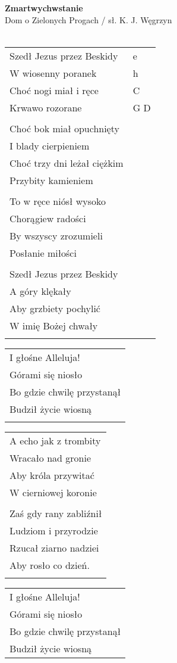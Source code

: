 \documentclass[a5paper]{article}
\begin{document}


\noindent
\fontsize{12pt}{15pt}\selectfont
\textbf{Zmartwychwstanie} \\
\fontsize{8pt}{10pt}\selectfont
Dom o Zielonych Progach / sł. K. J. Węgrzyn \\ \\
\fontsize{10pt}{12pt}\selectfont
{}
\begin{tabular}{@{}p{6.00cm}p{3cm}@{}}
\noindent
Szedł Jezus przez Beskidy & e \\
W wiosenny poranek & h \\
Choć nogi miał i ręce & C \\
Krwawo rozorane & G D \\ \\

Choć bok miał opuchnięty \\
I blady cierpieniem \\
Choć trzy dni leżał ciężkim \\
Przybity kamieniem \\ \\

To w ręce niósł wysoko \\
Chorągiew radości \\
By wszyscy zrozumieli \\ 
Posłanie miłości \\ \\

Szedł Jezus przez Beskidy \\
A góry klękały \\
Aby grzbiety pochylić \\
W imię Bożej chwały \\ \\
\end{tabular}

\noindent
\begin{tabular}{@{}p{5.00cm}@{}}
I głośne Alleluja! \\
Górami się niosło \\
Bo gdzie chwilę przystanął \\
Budził życie wiosną \\ \\
\end{tabular}

\noindent
\begin{tabular}{@{}p{6.00cm}@{}}
A echo jak z trombity \\
Wracało nad gronie \\
Aby króla przywitać \\
W cierniowej koronie \\ \\

Zaś gdy rany zabliźnił \\
Ludziom i przyrodzie \\
Rzucał ziarno nadziei \\
Aby rosło co dzień. \\ \\
\end{tabular}

\noindent
\begin{tabular}{@{}p{5.00cm}@{}}
I głośne Alleluja! \\
Górami się niosło \\
Bo gdzie chwilę przystanął \\
Budził życie wiosną 
\end{tabular}
\end{document}
